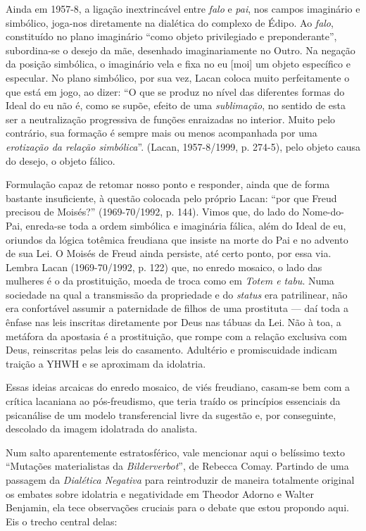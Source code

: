 Ainda em 1957-8, a ligação inextrincável entre \emph{falo} e \emph{pai},
nos campos imaginário e simbólico, joga-nos diretamente na
dialética do complexo de Édipo. Ao \emph{falo}, constituído no plano
imaginário ``como objeto privilegiado e preponderante'', subordina-se o
desejo da mãe, desenhado imaginariamente no Outro. Na negação da posição
simbólica, o imaginário vela e fixa no eu {[}moi{]} um objeto específico
e especular. No plano simbólico, por sua vez, Lacan coloca muito
perfeitamente o que está em jogo, ao dizer: ``O que se produz no nível
das diferentes formas do Ideal do eu não é, como se supõe, efeito de uma
\emph{sublimação}, no sentido de esta ser a neutralização progressiva de
funções enraizadas no interior. Muito pelo contrário, sua formação é
sempre mais ou menos acompanhada por uma \emph{erotização da relação
simbólica}''. (Lacan, 1957-8/1999, p. 274-5), pelo objeto causa do
desejo, o objeto fálico.

Formulação capaz de retomar nosso ponto e responder, ainda que de forma
bastante insuficiente, à questão colocada pelo próprio Lacan: ``por que
Freud precisou de Moisés?'' (1969-70/1992, p. 144). Vimos que, do lado
do Nome-do-Pai, enreda-se toda a ordem simbólica e imaginária fálica,
além do Ideal de eu, oriundos da lógica totêmica freudiana que insiste
na morte do Pai e no advento de sua Lei. O Moisés de Freud ainda
persiste, até certo ponto, por essa via. Lembra Lacan (1969-70/1992, p.
122) que, no enredo mosaico, o lado das mulheres é o da prostituição,
moeda de troca como em \emph{Totem e tabu}. Numa sociedade na qual a
transmissão da propriedade e do \emph{status} era patrilinear, não era
confortável assumir a paternidade de filhos de uma prostituta --- daí
toda a ênfase nas leis inscritas diretamente por Deus nas tábuas da Lei.
Não à toa, a metáfora da apostasia é a prostituição, que rompe com a
relação exclusiva com Deus, reinscritas pelas leis do casamento.
Adultério e promiscuidade indicam traição a YHWH e se aproximam da
idolatria.

Essas ideias arcaicas do enredo mosaico, de viés freudiano, casam-se bem
com a crítica lacaniana ao pós-freudismo, que teria traído os princípios
essenciais da psicanálise de um modelo transferencial livre da sugestão
e, por conseguinte, descolado da imagem idolatrada do analista.

Num salto aparentemente estratosférico, vale mencionar aqui o belíssimo
texto ``Mutações materialistas da \emph{Bilderverbot}'', de Rebecca
Comay. Partindo de uma passagem da \emph{Dialética Negativa} para
reintroduzir de maneira totalmente original os embates sobre idolatria e
negatividade em Theodor Adorno e Walter Benjamin, ela tece observações
cruciais para o debate que estou propondo aqui. Eis o trecho central
delas:

